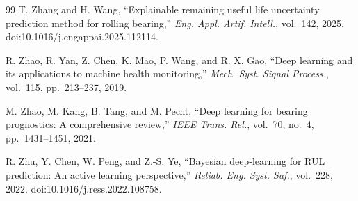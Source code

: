 \documentclass[pdflatex,sn-basic,NameDate]{sn-jnl}
\begin{document}
\begin{thebibliography}{99}
T. Zhang and H. Wang,
``Explainable remaining useful life uncertainty prediction method for rolling bearing,'' \textit{Eng. Appl. Artif. Intell.}, vol.~142, 2025. doi:10.1016/j.engappai.2025.112114.

R. Zhao, R. Yan, Z. Chen, K. Mao, P. Wang, and R. X. Gao,
``Deep learning and its applications to machine health monitoring,''
\textit{Mech. Syst. Signal Process.}, vol.~115, pp.~213--237, 2019.

M. Zhao, M. Kang, B. Tang, and M. Pecht,
``Deep learning for bearing prognostics: A comprehensive review,''
\textit{IEEE Trans. Rel.}, vol.~70, no.~4, pp.~1431--1451, 2021.

R. Zhu, Y. Chen, W. Peng, and Z.-S. Ye,
``Bayesian deep-learning for RUL prediction: An active learning perspective,'' \textit{Reliab. Eng. Syst. Saf.}, vol.~228, 2022. doi:10.1016/j.ress.2022.108758.
\end{thebibliography}
\end{document}
